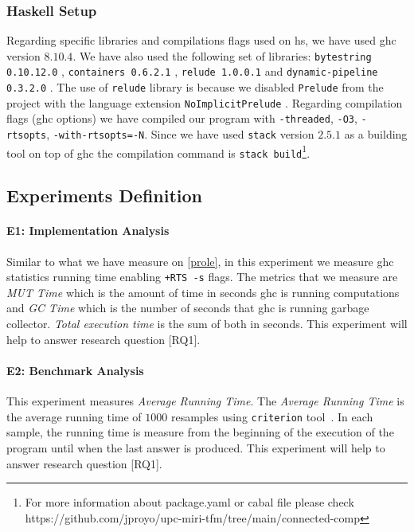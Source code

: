 \subsubsection{Haskell Setup}
Regarding specific libraries and compilations flags used on \acrshort{hs}, we have used \acrshort{ghc} version $8.10.4$. 
We have also used the following set of libraries: \texttt{bytestring 0.10.12.0} \cite{bytestring}, \texttt{containers 0.6.2.1} \cite{containers}, \texttt{relude 1.0.0.1} \cite{relude} and \texttt{dynamic-pipeline 0.3.2.0} \cite{dynamic-pipeline}. 
The use of \texttt{relude} library is because we disabled \texttt{Prelude} from the project with the language extension \texttt{NoImplicitPrelude} \cite{extensions}. 
Regarding compilation flags (\acrshort{ghc} options) we have compiled our program with \texttt{-threaded}, \texttt{-O3}, \texttt{-rtsopts}, \texttt{-with-rtsopts=-N}. 
Since we have used \texttt{stack} version $2.5.1$ \cite{stack} as a building tool on top of \acrshort{ghc} the compilation command is \texttt{stack build}\footnote{For more information about package.yaml or cabal file please check https://github.com/jproyo/upc-miri-tfm/tree/main/connected-comp}.

\subsection{Experiments Definition}\label{sub:new:exp:def}
\paragraph{E1: Implementation Analysis}
Similar to what we have measure on \autoref{prole}, in this experiment we measure \acrshort{ghc} statistics running time enabling \texttt{+RTS -s} flags.
The metrics that we measure are \emph{MUT Time} which is the amount of time in seconds \acrshort{ghc} is running computations and \emph{GC Time} which is the number of seconds that \acrshort{ghc} is running garbage collector. 
\emph{Total execution time} is the sum of both in seconds. This experiment will help to answer research question [RQ1].

\paragraph{E2: Benchmark Analysis}
This experiment measures \emph{Average Running Time}.
The \emph{Average Running Time} is the average running time of $1000$ resamples using \texttt{criterion} tool~\cite{criterion}. 
In each sample, the running time is measure from the beginning of the execution of the program until when the last answer is produced.
This experiment will help to answer research question [RQ1].

